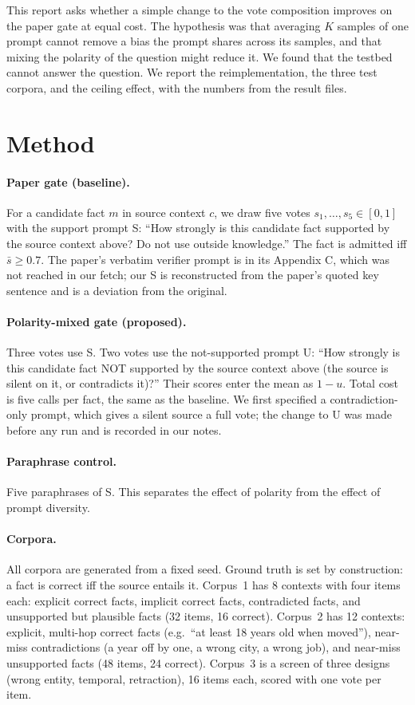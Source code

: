 \documentclass[11pt]{article}
\begin{document}
This report asks whether a simple change to the vote composition improves on the paper gate at equal cost. The hypothesis was that averaging $K$ samples of one prompt cannot remove a bias the prompt shares across its samples, and that mixing the polarity of the question might reduce it. We found that the testbed cannot answer the question. We report the reimplementation, the three test corpora, and the ceiling effect, with the numbers from the result files.

\section{Method}
\paragraph{Paper gate (baseline).} For a candidate fact $m$ in source context $c$, we draw five votes $s_1,\dots,s_5\in[0,1]$ with the support prompt S: ``How strongly is this candidate fact supported by the source context above? Do not use outside knowledge.'' The fact is admitted iff $\bar{s}\ge 0.7$. The paper's verbatim verifier prompt is in its Appendix C, which was not reached in our fetch; our S is reconstructed from the paper's quoted key sentence and is a deviation from the original.

\paragraph{Polarity-mixed gate (proposed).} Three votes use S. Two votes use the not-supported prompt U: ``How strongly is this candidate fact NOT supported by the source context above (the source is silent on it, or contradicts it)?'' Their scores enter the mean as $1-u$. Total cost is five calls per fact, the same as the baseline. We first specified a contradiction-only prompt, which gives a silent source a full vote; the change to U was made before any run and is recorded in our notes.

\paragraph{Paraphrase control.} Five paraphrases of S. This separates the effect of polarity from the effect of prompt diversity.

\paragraph{Corpora.} All corpora are generated from a fixed seed. Ground truth is set by construction: a fact is correct iff the source entails it. Corpus~1 has 8 contexts with four items each: explicit correct facts, implicit correct facts, contradicted facts, and unsupported but plausible facts (32 items, 16 correct). Corpus~2 has 12 contexts: explicit, multi-hop correct facts (e.g.\ ``at least 18 years old when moved''), near-miss contradictions (a year off by one, a wrong city, a wrong job), and near-miss unsupported facts (48 items, 24 correct). Corpus~3 is a screen of three designs (wrong entity, temporal, retraction), 16 items each, scored with one vote per item.
\end{document}

